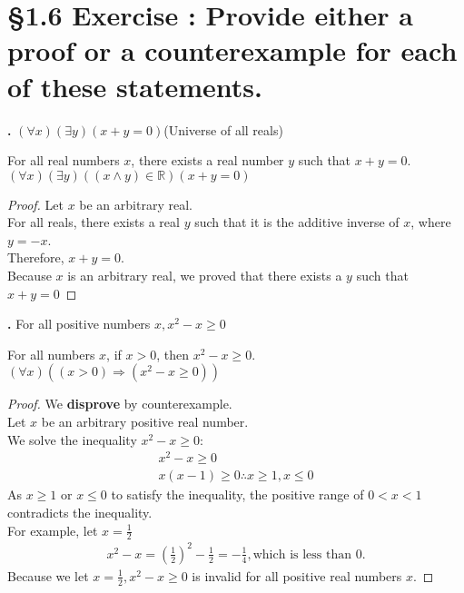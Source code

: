\documentclass[a4paper,11pt]{article}
\begin{document}
\newpage

\setcounter{ProblemCounter}{4}
\setcounter{SubsectionCounter}{2}
\section*{\S 1.6 Exercise : Provide either a proof or a 
counterexample for each of these statements.}
\textbf{.}
\((\forall x)(\exists y)(x+y=0)\)(Universe of all reals)
\begin{theorem3}
  For all real numbers \(x\), there exists a real number \(y\) such that 
  \(x+y=0\).\\
  \((\forall x)(\exists y)((x \wedge y)\in \mathbb{R})(x+y=0)\)
\begin{proof}
Let \(x\) be an arbitrary real.\\
For all reals, there exists a real \(y\) such 
that it is the additive inverse of \(x\), where \(y=-x\).\\
Therefore, \(x+y=0\).\\
Because \(x\) is an arbitrary real, we proved that there exists a \(y\) such 
that \(x+y=0\)
\end{proof}
\end{theorem3}

\setcounter{ProblemCounter}{4}
\setcounter{SubsectionCounter}{6}
\noindent\textbf{.}
For all positive numbers \(x, x^2-x \geq 0\)
\begin{theorem3}
  For all numbers \(x\), if \(x > 0\), then \(x^2-x \geq 0\).\\
  \((\forall x)((x > 0)\Rightarrow (x^2-x \geq 0))\)
\begin{proof}
We \textbf{disprove} by counterexample.\\
Let \(x\) be an arbitrary positive real number.\\
We solve the inequality \(x^2-x \geq 0\):
\begin{gather*}
  x^2-x \geq 0\\ x(x-1)\geq 0\therefore x \geq 1, x \leq 0
\end{gather*}
As \(x \geq 1\) or \(x \leq 0\) to satisfy the inequality, the positive range of 
\(0<x<1\) contradicts the inequality.\\
For example, let \(x=\frac{1}{2}\)
\begin{gather*}
  x^2-x = (\frac{1}{2})^2-\frac{1}{2}=-\frac{1}{4}, \text{which is less than 0}.
\end{gather*}
Because we let \(x=\frac{1}{2}, x^2-x \geq 0\) is invalid for all positive real 
numbers \(x\).
\end{proof}
\end{theorem3}
\end{document}
